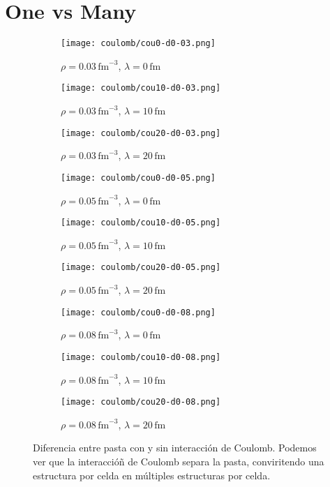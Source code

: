 \section{One vs Many} \label{pasta-bup}

\begin{figure}
\centering
\begin{subfigure}[h!]{0.5\columnwidth}
  \centering
  \texttt{[image: coulomb/cou0-d0-03.png]}
  \caption{$\rho=0.03\,\text{fm}^{-3}$, $\lambda=0\,\text{fm}$}
\end{subfigure}
\begin{subfigure}[h!]{0.5\columnwidth}
  \centering
  \texttt{[image: coulomb/cou10-d0-03.png]}
  \caption{$\rho=0.03\,\text{fm}^{-3}$, $\lambda=10\,\text{fm}$}
\end{subfigure}
\begin{subfigure}[h!]{0.5\columnwidth}
  \centering
  \texttt{[image: coulomb/cou20-d0-03.png]}
  \caption{$\rho=0.03\,\text{fm}^{-3}$, $\lambda=20\,\text{fm}$}
\end{subfigure}

\begin{subfigure}[h!]{0.5\columnwidth}
  \centering
  \texttt{[image: coulomb/cou0-d0-05.png]}
  \caption{$\rho=0.05\,\text{fm}^{-3}$, $\lambda=0\,\text{fm}$}
\end{subfigure}
\begin{subfigure}[h!]{0.5\columnwidth}
  \centering
  \texttt{[image: coulomb/cou10-d0-05.png]}
  \caption{$\rho=0.05\,\text{fm}^{-3}$, $\lambda=10\,\text{fm}$}
\end{subfigure}
\begin{subfigure}[h!]{0.5\columnwidth}
  \centering
  \texttt{[image: coulomb/cou20-d0-05.png]}
  \caption{$\rho=0.05\,\text{fm}^{-3}$, $\lambda=20\,\text{fm}$}
\end{subfigure}

\begin{subfigure}[h!]{0.5\columnwidth}
  \centering
  \texttt{[image: coulomb/cou0-d0-08.png]}
  \caption{$\rho=0.08\,\text{fm}^{-3}$, $\lambda=0\,\text{fm}$}
\end{subfigure}
\begin{subfigure}[h!]{0.5\columnwidth}
  \centering
  \texttt{[image: coulomb/cou10-d0-08.png]}
  \caption{$\rho=0.08\,\text{fm}^{-3}$, $\lambda=10\,\text{fm}$}
\end{subfigure}
\begin{subfigure}[h!]{0.5\columnwidth}
  \centering
  \texttt{[image: coulomb/cou20-d0-08.png]}
  \caption{$\rho=0.08\,\text{fm}^{-3}$, $\lambda=20\,\text{fm}$}
\end{subfigure}
\caption{Diferencia entre pasta con y sin interacción de Coulomb.
  Podemos ver que la interaccióñ de Coulomb separa la pasta, conviritendo una estructura por celda en múltiples estructuras por celda.}
\label{fig:w-wo-coulomb}
\end{figure}

